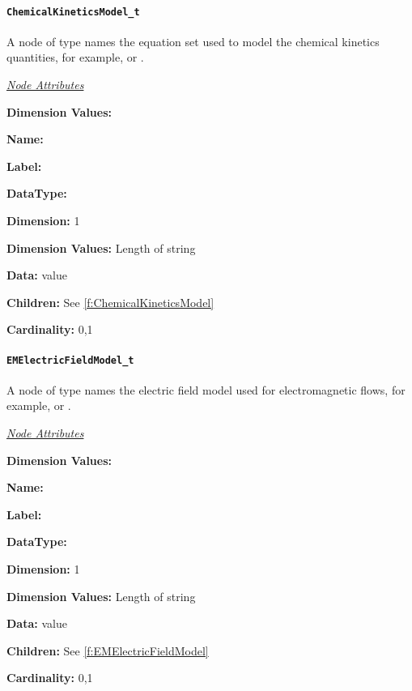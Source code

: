 \paragraph{\texttt{ChemicalKineticsModel\_t}}

A node of type  names the equation
set used to model the chemical kinetics quantities, for example,
 or .

\textit{\uline{Node Attributes}}
\begin{Ventryic}{\textbf{Dimension Values:}}
\item [\textbf{Name:}]
\item [\textbf{Label:}]
\item [\textbf{DataType:}]
\item [\textbf{Dimension:}]
      1
\item [\textbf{Dimension Values:}]
      Length of string
\item [\textbf{Data:}]
       value
\item [\textbf{Children:}]
      See \autoref{f:ChemicalKineticsModel}
\item [\textbf{Cardinality:}]
      0,1
\end{Ventryic}

\paragraph{\texttt{EMElectricFieldModel\_t}}

A node of type  names the electric
field model used for electromagnetic flows, for example,
 or .

\textit{\uline{Node Attributes}}
\begin{Ventryic}{\textbf{Dimension Values:}}
\item [\textbf{Name:}]
\item [\textbf{Label:}]
\item [\textbf{DataType:}]
\item [\textbf{Dimension:}]
      1
\item [\textbf{Dimension Values:}]
      Length of string
\item [\textbf{Data:}]
       value
\item [\textbf{Children:}]
      See \autoref{f:EMElectricFieldModel}
\item [\textbf{Cardinality:}]
      0,1
\end{Ventryic}

